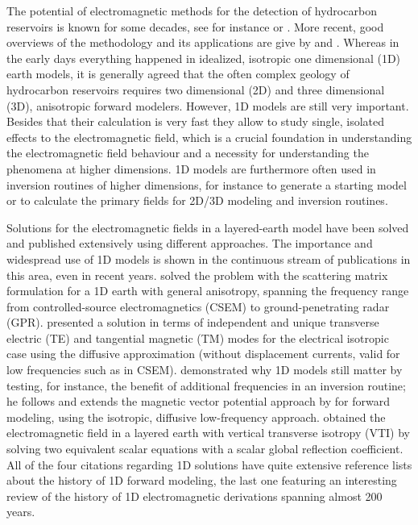 \documentclass[manuscript,revised]{geophysics}
\begin{document}
The potential of electromagnetic methods for the detection of hydrocarbon
reservoirs is known for some decades, see for instance \cite{PIEEE.89.Nekut} or
\cite{B.SEG.91.Chave}. More recent, good overviews of the methodology and its
applications are give by \cite{SG.05.Edwards} and \cite{IEEE.12.Ziolkowksi}.
Whereas in the early days everything happened in idealized, isotropic one
dimensional (1D) earth models, it is generally agreed that the often complex
geology of hydrocarbon reservoirs requires two dimensional (2D) and three
dimensional (3D), anisotropic forward modelers. However, 1D models are still
very important. Besides that their calculation is very fast they allow to study
single, isolated effects to the electromagnetic field, which is a crucial
foundation in understanding the electromagnetic field behaviour and a necessity
for understanding the phenomena at higher dimensions. 1D models are furthermore
often used in inversion routines of higher dimensions, for instance to generate
a starting model or to calculate the primary fields for 2D/3D modeling and
inversion routines.

Solutions for the electromagnetic fields in a layered-earth model have been
solved and published extensively using different approaches. The importance and
wide\-spread use of 1D models is shown in the continuous stream of publications
in this area, even in recent years. \cite{GJI.07.Loseth} solved the problem
with the scattering matrix formulation for a 1D earth with general anisotropy,
spanning the frequency range from controlled-source electromagnetics (CSEM) to
ground-pe\-ne\-tra\-ting radar (GPR). \cite{GJI.09.Chave} presented a solution
in terms of independent and unique transverse electric (TE) and tangential
magnetic (TM) modes for the electrical isotropic case using the diffusive
approximation (without displacement currents, valid for low frequencies such as
in CSEM). \cite{GEO.09.Key} demonstrated why 1D models still matter by testing,
for instance, the benefit of additional frequencies in an inversion routine; he
follows and extends the magnetic vector potential approach by
\cite{B.AP.82.Wait} for forward modeling, using the isotropic, diffusive
low-frequency approach. \cite{GEO.15.Hunziker} obtained the electromagnetic
field in a layered earth with vertical transverse iso\-tro\-py (VTI) by solving
two equivalent scalar equations with a scalar global reflection coefficient.
All of the four citations regarding 1D solutions have quite extensive reference
lists about the history of 1D forward modeling, the last one featuring an
interesting review of the history of 1D electromagnetic derivations spanning
almost 200 years.
\end{document}
